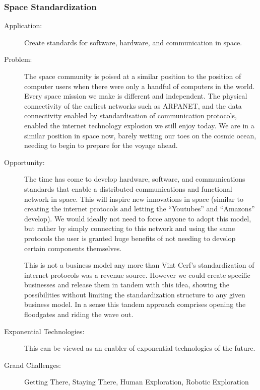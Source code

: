 \subsubsection{Space Standardization}
\label{ipip}
\begin{description}   \item[Application:] Create standards for software, hardware, and   communication in space.
 
\item[Problem:] The space  community is poised at a similar position to the position of computer   users when there were only a handful of computers in the world. Every space mission we make is different and independent. The physical   connectivity of the earliest networks such as \gls{ARPANET}, and the data connectivity enabled by standardisation of communication protocols,   enabled the internet technology explosion we still enjoy today. We are   in a similar position in space now, barely wetting our toes on the cosmic ocean, needing to begin to prepare for the voyage ahead.
 
\item[Opportunity:] The time has   come to develop hardware, software, and communications standards that   enable a distributed communications and functional network in space.   This will inspire new innovations in space (similar to creating the   internet protocols and letting the ``Youtubes'' and ``Amazons'' develop).  We would ideally not need to force anyone to adopt this model, but  rather  by simply connecting to this network and using the same  protocols the  user is granted huge benefits of not needing to develop  certain  components themselves.
 
This is not a business model any  more than \gls{Vint} Cerf's standardization of internet protocols was a   revenue source. However we could create specific businesses and release   them in tandem with this idea, showing the possibilities without   limiting the standardization structure to any given business model. 
In a sense this tandem approach comprises opening the floodgates and riding the wave out.
 
\item[Exponential Technologies:]   This can be viewed as an enabler of exponential technologies of the future. 
 
\item[Grand Challenges:] Getting There, Staying There, Human Exploration, Robotic Exploration


\end{description}
